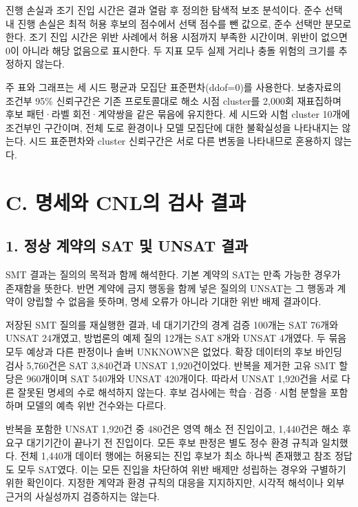 \documentclass[11pt,a4paper]{article}
\begin{document}
진행 손실과 조기 진입 시간은 결과 열람 후 정의한 탐색적 보조 분석이다. 준수 선택 내 진행 손실은 최적 허용 후보의 점수에서 선택 점수를 뺀 값으로, 준수 선택만 분모로 한다. 조기 진입 시간은 위반 사례에서 허용 시점까지 부족한 시간이며, 위반이 없으면 0이 아니라 해당 없음으로 표시한다. 두 지표 모두 실제 거리나 충돌 위험의 크기를 추정하지 않는다.\par

주 표와 그래프는 세 시드 평균과 모집단 표준편차(ddof=0)를 사용한다. 보충자료의 조건부 95\% 신뢰구간은 기존 프로토콜대로 해소 시점 cluster를 2,000회 재표집하며 후보 패턴·라벨 회전·계약쌍을 같은 묶음에 유지한다. 세 시드와 시험 cluster 10개에 조건부인 구간이며, 전체 도로 환경이나 모델 모집단에 대한 불확실성을 나타내지는 않는다. 시드 표준편차와 cluster 신뢰구간은 서로 다른 변동을 나타내므로 혼용하지 않는다.\par

\section*{C. 명세와 CNL의 검사 결과}

\subsection*{1. 정상 계약의 SAT 및 UNSAT 결과}

SMT 결과는 질의의 목적과 함께 해석한다. 기본 계약의 SAT는 만족 가능한 경우가 존재함을 뜻한다. 반면 계약에 금지 행동을 함께 넣은 질의의 UNSAT는 그 행동과 계약이 양립할 수 없음을 뜻하며, 명세 오류가 아니라 기대한 위반 배제 결과이다.\par

저장된 SMT 질의를 재실행한 결과, 네 대기기간의 경계 검증 100개는 SAT 76개와 UNSAT 24개였고, 방법론의 예제 질의 12개는 SAT 8개와 UNSAT 4개였다. 두 묶음 모두 예상과 다른 판정이나 솔버 UNKNOWN은 없었다. 확장 데이터의 후보 바인딩 검사 5,760건은 SAT 3,840건과 UNSAT 1,920건이었다. 반복을 제거한 고유 SMT 할당은 960개이며 SAT 540개와 UNSAT 420개이다. 따라서 UNSAT 1,920건을 서로 다른 잘못된 명세의 수로 해석하지 않는다. 후보 검사에는 학습·검증·시험 분할을 포함하며 모델의 예측 위반 건수와는 다르다.\par

반복을 포함한 UNSAT 1,920건 중 480건은 영역 해소 전 진입이고, 1,440건은 해소 후 요구 대기기간이 끝나기 전 진입이다. 모든 후보 판정은 별도 정수 환경 규칙과 일치했다. 전체 1,440개 데이터 행에는 허용되는 진입 후보가 최소 하나씩 존재했고 참조 정답도 모두 SAT였다. 이는 모든 진입을 차단하여 위반 배제만 성립하는 경우와 구별하기 위한 확인이다. 지정한 계약과 환경 규칙의 대응을 지지하지만, 시각적 해석이나 외부 근거의 사실성까지 검증하지는 않는다.\par
\end{document}
